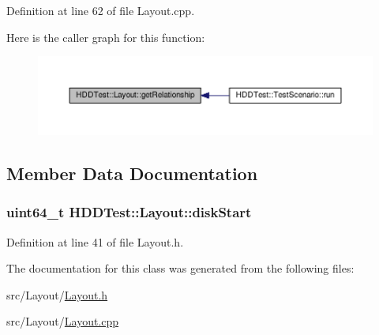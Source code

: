 Definition at line 62 of file Layout.\-cpp.



Here is the caller graph for this function\-:
\nopagebreak
\begin{figure}[H]
\begin{center}
\leavevmode
\includegraphics[width=350pt]{class_h_d_d_test_1_1_layout_af7aef9c0227433e1cfc6252cb85e8dc3_icgraph}
\end{center}
\end{figure}




\subsection{Member Data Documentation}
\hypertarget{class_h_d_d_test_1_1_layout_aeba9e8e44b4ba70259ff783680b988fe}{
\subsubsection[{disk\-Start}]{\setlength{\rightskip}{0pt plus 5cm}uint64\-\_\-t H\-D\-D\-Test\-::\-Layout\-::disk\-Start}}\label{class_h_d_d_test_1_1_layout_aeba9e8e44b4ba70259ff783680b988fe}


Definition at line 41 of file Layout.\-h.



The documentation for this class was generated from the following files\-:\begin{DoxyCompactItemize}
\item 
src/\-Layout/\hyperlink{_layout_8h}{Layout.\-h}\item 
src/\-Layout/\hyperlink{_layout_8cpp}{Layout.\-cpp}\end{DoxyCompactItemize}

